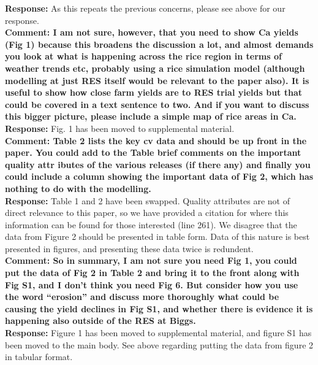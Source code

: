 \documentclass{article} \usepackage[margin=1in]{geometry}
\begin{document}
\textbf{Response:} As this repeats the previous concerns, please see
above for our response.\\

\textbf{Comment: I am not sure, however, that you need to show Ca
  yields (Fig 1) because this broadens the discussion a lot, and
  almost demands you look at what is happening across the rice region
  in terms of weather trends etc, probably using a rice simulation
  model (although modelling at just RES itself would be relevant to
  the paper also). It is useful to show how close farm yields are to
  RES trial yields but that could be covered in a text sentence to
  two. And if you want to discuss this bigger picture, please include
  a simple map of rice areas in Ca.}\\

\textbf{Response:} Fig. 1 has been moved to supplemental material.\\

\textbf{Comment: Table 2 lists the key cv data and should be up front
  in the paper. You could add to the Table brief comments on the
  important quality attr ibutes of the various releases (if there any)
  and finally you could include a column showing the important data of
  Fig 2, which has nothing to do with the modelling.}\\

\textbf{Response:} Table 1 and 2 have been swapped. Quality attributes
are not of direct relevance to this paper, so we have provided a
citation for where this information can be found for those interested
(line 261). We disagree that the data from Figure 2 should be
presented in table form. Data of this nature is best presented in
figures, and presenting these data twice is redundent.\\

\textbf{Comment: So in summary, I am not sure you need Fig 1, you
  could put the data of Fig 2 in Table 2 and bring it to the front
  along with Fig S1, and I don’t think you need Fig 6. But consider
  how you use the word “erosion” and discuss more thoroughly what
  could be causing the yield declines in Fig S1, and whether there is
  evidence it is happening also outside of the RES at Biggs.}\\

\textbf{Response:} Figure 1 has been moved to supplemental material,
and figure S1 has been moved to the main body. See above regarding
putting the data from figure 2 in tabular format.\\
\end{document}
